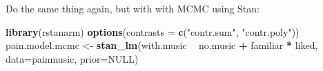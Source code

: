 \documentclass[]{article}
\newenvironment{Shaded}{\begin{snugshade}}{\end{snugshade}}
\newcommand{\DataTypeTok}[1]{\textcolor[rgb]{0.13,0.29,0.53}{#1}}
\newcommand{\KeywordTok}[1]{\textcolor[rgb]{0.13,0.29,0.53}{\textbf{#1}}}
\newcommand{\NormalTok}[1]{#1}
\newcommand{\OperatorTok}[1]{\textcolor[rgb]{0.81,0.36,0.00}{\textbf{#1}}}
\newcommand{\OtherTok}[1]{\textcolor[rgb]{0.56,0.35,0.01}{#1}}
\newcommand{\StringTok}[1]{\textcolor[rgb]{0.31,0.60,0.02}{#1}}
\begin{document}
Do the same thing again, but with with MCMC using Stan:

\begin{Shaded}
\begin{Highlighting}[]
\KeywordTok{library}\NormalTok{(rstanarm)}
\KeywordTok{options}\NormalTok{(}\DataTypeTok{contrasts =} \KeywordTok{c}\NormalTok{(}\StringTok{"contr.sum"}\NormalTok{, }\StringTok{"contr.poly"}\NormalTok{))}
\NormalTok{pain.model.mcmc <-}\StringTok{ }\KeywordTok{stan_lm}\NormalTok{(with.music }\OperatorTok{~}\StringTok{ }\NormalTok{no.music }\OperatorTok{+}\StringTok{ }\NormalTok{familiar }\OperatorTok{*}\StringTok{ }\NormalTok{liked,}
                          \DataTypeTok{data=}\NormalTok{painmusic, }\DataTypeTok{prior=}\OtherTok{NULL}\NormalTok{)}
\end{Highlighting}
\end{Shaded}
\end{document}
